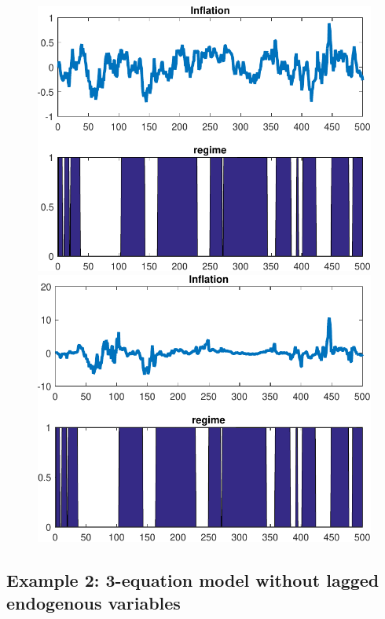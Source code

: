 \documentclass[12pt,reqno]{article}
\numberwithin{equation}{section}
\begin{document}
\begin{figure}[H]
\includegraphics[scale=0.6]{fisher_simulation1_pinf.pdf} 
\includegraphics[scale=0.6]{fisher_simulation2_pinf.pdf} \\
\end{figure}



\newpage

\subsection*{Example 2: 3-equation model without lagged endogenous variables} 
\end{document}
